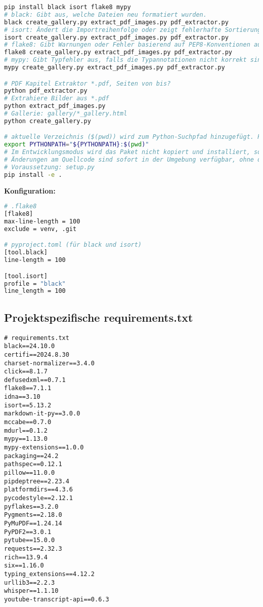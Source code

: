 \documentclass{vorlage-design-main}
\begin{document}
\begin{lstlisting}[language=bash]
pip install black isort flake8 mypy
# black: Gibt aus, welche Dateien neu formatiert wurden.
black create_gallery.py extract_pdf_images.py pdf_extractor.py
# isort: Ändert die Importreihenfolge oder zeigt fehlerhafte Sortierungen an.
isort create_gallery.py extract_pdf_images.py pdf_extractor.py
# flake8: Gibt Warnungen oder Fehler basierend auf PEP8-Konventionen aus
flake8 create_gallery.py extract_pdf_images.py pdf_extractor.py
# mypy: Gibt Typfehler aus, falls die Typannotationen nicht korrekt sind.
mypy create_gallery.py extract_pdf_images.py pdf_extractor.py

# PDF Kapitel Extraktor *.pdf, Seiten von bis?
python pdf_extractor.py
# Extrahiere Bilder aus *.pdf
python extract_pdf_images.py
# Gallerie: gallery/*_gallery.html
python create_gallery.py

# aktuelle Verzeichnis ($(pwd)) wird zum Python-Suchpfad hinzugefügt. Python Module und Pakete, die sich in diesem Verzeichnis befinden, erkennt und importieren kann.
export PYTHONPATH="${PYTHONPATH}:$(pwd)"
# Im Entwicklungsmodus wird das Paket nicht kopiert und installiert, sondern als Referenz zur aktuellen Verzeichnisstruktur verlinkt.
# Änderungen am Quellcode sind sofort in der Umgebung verfügbar, ohne dass man das Paket erneut installieren muss.
# Voraussetzung: setup.py
pip install -e .
\end{lstlisting}

\textbf{Konfiguration:}

\begin{lstlisting}[language=bash]
# .flake8
[flake8]
max-line-length = 100
exclude = venv, .git

# pyproject.toml (für black und isort)
[tool.black]
line-length = 100

[tool.isort]
profile = "black"
line_length = 100
\end{lstlisting}

\subsection{Projektspezifische
requirements.txt}\label{projektspezifische-requirements.txt}

\begin{lstlisting}
# requirements.txt
black==24.10.0
certifi==2024.8.30
charset-normalizer==3.4.0
click==8.1.7
defusedxml==0.7.1
flake8==7.1.1
idna==3.10
isort==5.13.2
markdown-it-py==3.0.0
mccabe==0.7.0
mdurl==0.1.2
mypy==1.13.0
mypy-extensions==1.0.0
packaging==24.2
pathspec==0.12.1
pillow==11.0.0
pipdeptree==2.23.4
platformdirs==4.3.6
pycodestyle==2.12.1
pyflakes==3.2.0
Pygments==2.18.0
PyMuPDF==1.24.14
PyPDF2==3.0.1
pytube==15.0.0
requests==2.32.3
rich==13.9.4
six==1.16.0
typing_extensions==4.12.2
urllib3==2.2.3
whisper==1.1.10
youtube-transcript-api==0.6.3
\end{lstlisting}
\end{document}
